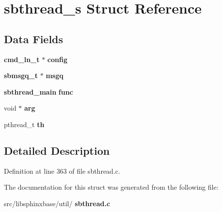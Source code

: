 \section{sbthread\+\_\+s Struct Reference}
\label{structsbthread__s}
\subsection*{Data Fields}
\begin{DoxyCompactItemize}
\item 
\mbox{\label{structsbthread__s_aa8bb19dfc838bfe0982be55bbd465fce}} 
\textbf{ cmd\+\_\+ln\+\_\+t} $\ast$ {\bfseries config}
\item 
\mbox{\label{structsbthread__s_a6bcbf60b6ee22edc7bec8173a917d0f1}} 
\textbf{ sbmsgq\+\_\+t} $\ast$ {\bfseries msgq}
\item 
\mbox{\label{structsbthread__s_a72ee08278db6c8e9ce3b41874764b1d6}} 
\textbf{ sbthread\+\_\+main} {\bfseries func}
\item 
\mbox{\label{structsbthread__s_af2871ded3db7b22a948b7f0d345739db}} 
void $\ast$ {\bfseries arg}
\item 
\mbox{\label{structsbthread__s_adf5cbb42d7457ae244420cd679347de7}} 
pthread\+\_\+t {\bfseries th}
\end{DoxyCompactItemize}


\subsection{Detailed Description}


Definition at line 363 of file sbthread.\+c.



The documentation for this struct was generated from the following file\+:\begin{DoxyCompactItemize}
\item 
src/libsphinxbase/util/\textbf{ sbthread.\+c}\end{DoxyCompactItemize}
